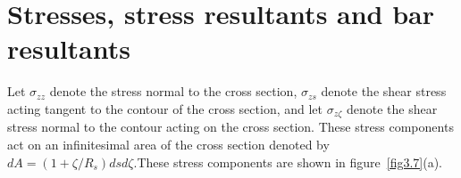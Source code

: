 \documentclass{AeroStructure-ERJohnson}
\begin{document}
\section{Stresses, stress resultants and bar resultants}\label{sec3.5}

Let $\sigma_{z z}$ denote the stress normal to the cross section, $\sigma_{z s}$ denote the shear stress acting tangent to the contour of the cross section, and let $\sigma_{z \zeta}$ denote the shear stress normal to the contour acting on the cross section. These stress components act on an infinitesimal area of the cross section denoted by $d A=\left(1+\zeta / R_{s}\right) d s d \zeta$.These stress components\enlargethispage{-3\baselineskip} are shown in figure~\ref{fig3.7}(a).

{\def\thefigure{3.7}
}
\end{document}
